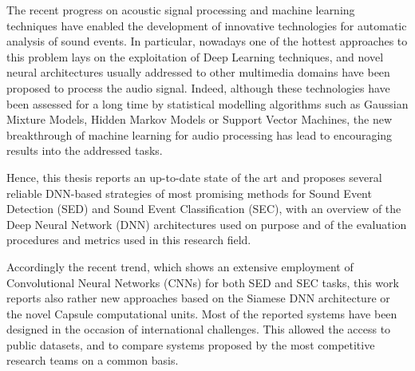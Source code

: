 \documentclass[a4print,english,lof,lot]{univpmphdthesis}
\begin{document}
\frontmatter

\maketitle

\begin{thesisacknowledge}

\end{thesisacknowledge}

\begin{thesisacknowledge}[italian]

\end{thesisacknowledge}

\begin{thesisabstract}
The recent progress on acoustic signal processing and machine learning techniques have enabled the
development of innovative technologies for automatic analysis of sound events. In particular, nowadays one of the hottest approaches to this problem lays on the exploitation of Deep Learning techniques, and novel neural architectures usually addressed to other multimedia domains have been proposed to process the audio signal. 
Indeed, although these technologies have been assessed for a long time by statistical modelling algorithms such as Gaussian Mixture Models, Hidden Markov Models or Support Vector Machines, the new breakthrough of machine learning for audio processing has lead to encouraging results into the addressed tasks.
 
Hence, this thesis reports an up-to-date state of the art and proposes several reliable DNN-based strategies of most promising methods for Sound Event Detection (SED) and Sound Event Classification (SEC), with an overview of the Deep Neural Network (DNN) architectures used on purpose and of the evaluation procedures and metrics used in this research field.

Accordingly the recent trend, which shows an extensive employment of Convolutional Neural Networks (CNNs) for both SED and SEC tasks, this work reports also rather new approaches based on the Siamese DNN architecture or the novel Capsule computational units.
Most of the reported systems have been designed in the occasion of international challenges. This allowed the access to public datasets, and to compare systems proposed by the most competitive research teams on a common basis.


\end{thesisabstract}
\end{document}
